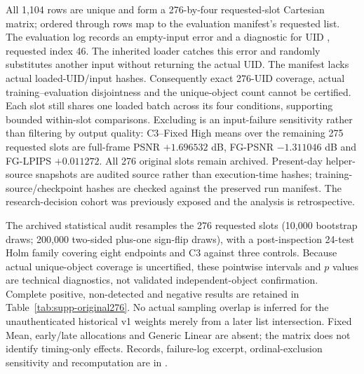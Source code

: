 \documentclass[11pt]{article}
\begin{document}
All 1,104 rows are unique and form a 276-by-four requested-slot Cartesian matrix; ordered  through  rows map to the evaluation manifest's requested list. The evaluation log records an empty-input error and a  diagnostic for UID , requested index 46. The inherited loader catches this error and randomly substitutes another input without returning the actual UID. The manifest lacks actual loaded-UID/input hashes. Consequently exact 276-UID coverage, actual training--evaluation disjointness and the unique-object count cannot be certified. Each slot still shares one loaded batch across its four conditions, supporting bounded within-slot comparisons. Excluding  is an input-failure sensitivity rather than filtering by output quality: C3--Fixed High means over the remaining 275 requested slots are full-frame PSNR $+1.696532$ dB, FG-PSNR $-1.311046$ dB and FG-LPIPS $+0.011272$. All 276 original slots remain archived. Present-day helper-source snapshots are audited source rather than execution-time hashes; training-source/checkpoint hashes are checked against the preserved run manifest. The research-decision cohort was previously exposed and the analysis is retrospective.

The archived statistical audit resamples the 276 requested slots (10,000 bootstrap draws; 200,000 two-sided plus-one sign-flip draws), with a post-inspection 24-test Holm family covering eight endpoints and C3 against three controls. Because actual unique-object coverage is uncertified, these pointwise intervals and $p$ values are technical diagnostics, not validated independent-object confirmation. Complete positive, non-detected and negative results are retained in Table~\ref{tab:supp-original276}. No actual sampling overlap is inferred for the unauthenticated historical v1 weights merely from a later list intersection. Fixed Mean, early/late allocations and Generic Linear are absent; the matrix does not identify timing-only effects. Records, failure-log excerpt, ordinal-exclusion sensitivity and recomputation are in .
\end{document}

